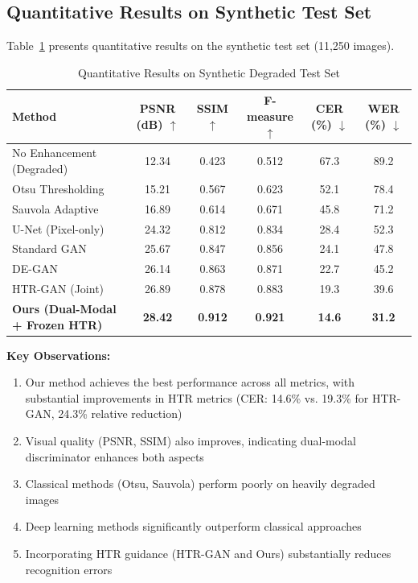 \documentclass[journal]{IEEEtran}
\begin{document}
\subsection{Quantitative Results on Synthetic Test Set}

Table~\ref{table_synthetic_results} presents quantitative results on the synthetic test set (11,250 images).

\begin{table}[!t]
\renewcommand{\arraystretch}{1.3}
\caption{Quantitative Results on Synthetic Degraded Test Set}
\label{table_synthetic_results}
\centering
\begin{tabular}{|l|c|c|c|c|c|}
\hline
\textbf{Method} & \textbf{PSNR (dB) $\uparrow$} & \textbf{SSIM $\uparrow$} & \textbf{F-measure $\uparrow$} & \textbf{CER (\%) $\downarrow$} & \textbf{WER (\%) $\downarrow$} \\
\hline
No Enhancement (Degraded) & 12.34 & 0.423 & 0.512 & 67.3 & 89.2 \\
Otsu Thresholding & 15.21 & 0.567 & 0.623 & 52.1 & 78.4 \\
Sauvola Adaptive & 16.89 & 0.614 & 0.671 & 45.8 & 71.2 \\
U-Net (Pixel-only) & 24.32 & 0.812 & 0.834 & 28.4 & 52.3 \\
Standard GAN & 25.67 & 0.847 & 0.856 & 24.1 & 47.8 \\
DE-GAN & 26.14 & 0.863 & 0.871 & 22.7 & 45.2 \\
HTR-GAN (Joint) & 26.89 & 0.878 & 0.883 & 19.3 & 39.6 \\
\hline
\textbf{Ours (Dual-Modal + Frozen HTR)} & \textbf{28.42} & \textbf{0.912} & \textbf{0.921} & \textbf{14.6} & \textbf{31.2} \\
\hline
\end{tabular}
\end{table}

\textbf{Key Observations:}
\begin{enumerate}
    \item Our method achieves the best performance across all metrics, with substantial improvements in HTR metrics (CER: 14.6\% vs. 19.3\% for HTR-GAN, 24.3\% relative reduction)
    \item Visual quality (PSNR, SSIM) also improves, indicating dual-modal discriminator enhances both aspects
    \item Classical methods (Otsu, Sauvola) perform poorly on heavily degraded images
    \item Deep learning methods significantly outperform classical approaches
    \item Incorporating HTR guidance (HTR-GAN and Ours) substantially reduces recognition errors
\end{enumerate}
\end{document}
